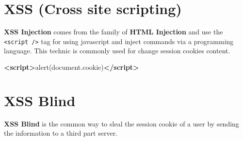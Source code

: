 \documentclass{assets/ipesethesis}
\newenvironment{Shaded}{\begin{snugshade}}{\end{snugshade}}
\newcommand{\AttributeTok}[1]{\textcolor[rgb]{0.77,0.63,0.00}{#1}}
\newcommand{\KeywordTok}[1]{\textcolor[rgb]{0.13,0.29,0.53}{\textbf{#1}}}
\newcommand{\NormalTok}[1]{#1}
\newcommand{\VariableTok}[1]{\textcolor[rgb]{0.00,0.00,0.00}{#1}}
\begin{document}
\hypertarget{xss-cross-site-scripting}{%
\section*{XSS (Cross site scripting)}\label{xss-cross-site-scripting}}

\textbf{XSS Injection} comes from the family of \textbf{HTML Injection} and use the \texttt{\textless{}script\ /\textgreater{}} tag for using javascript and inject commands via a programming
language. This technic is commonly used for change session cookies content.

\begin{Shaded}
\begin{Highlighting}[]
\KeywordTok{<script>}\AttributeTok{alert}\NormalTok{(}\VariableTok{document}\NormalTok{.}\AttributeTok{cookie}\NormalTok{)}\KeywordTok{</script>}
\end{Highlighting}
\end{Shaded}

\hypertarget{xss-blind}{%
\section*{XSS Blind}\label{xss-blind}}

\textbf{XSS Blind} is the common way to sleal the session cookie of a user by sending the information to a third part server.
\end{document}
